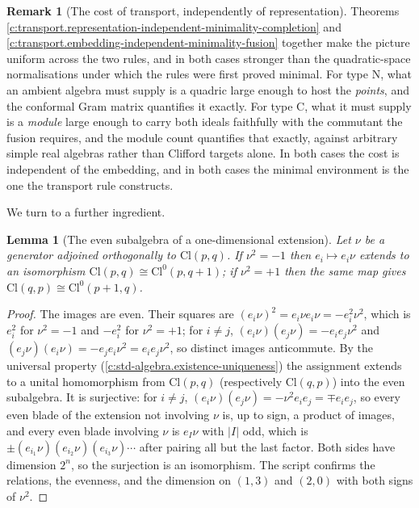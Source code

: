 \documentclass[11pt]{article}
\newtheorem{lemma}[theorem]{Lemma}
\theoremstyle{definition}
\newtheorem{remark}[theorem]{Remark}
\theoremstyle{plain}
\providecommand{\Cl}{}\renewcommand{\Cl}{\mathrm{Cl}}
\begin{document}
\begin{remark}[The cost of transport, independently of representation]\label{c:note.transport.cost-transport-independently-representation}
Theorems \ref{c:transport.representation-independent-minimality-completion} and \ref{c:transport.embedding-independent-minimality-fusion} together make the picture uniform across the two rules, and in both cases stronger than the quadratic-space normalisations under which the rules were first proved minimal. For type N, what an ambient algebra must supply is a quadric large enough to host the \emph{points}, and the conformal Gram matrix quantifies it exactly. For type C, what it must supply is a \emph{module} large enough to carry both ideals faithfully with the commutant the fusion requires, and the module count quantifies that exactly, against arbitrary simple real algebras rather than Clifford targets alone. In both cases the cost is independent of the embedding, and in both cases the minimal environment is the one the transport rule constructs.
\end{remark}

We turn to a further ingredient.

\begin{lemma}[The even subalgebra of a one-dimensional extension]\label{c:transport.even-subalgebra-one-dimensional-extension}
Let $\nu$ be a generator adjoined orthogonally to $\Cl(p,q)$. If $\nu^2 = -1$ then $e_i \mapsto e_i\nu$ extends to an isomorphism $\Cl(p,q) \cong \Cl^0(p,q{+}1)$; if $\nu^2 = +1$ then the same map gives $\Cl(q,p) \cong \Cl^0(p{+}1,q)$.
\end{lemma}
\begin{proof}
The images are even. Their squares are $(e_i\nu)^2 = e_i\nu e_i\nu = -e_i^2\nu^2$, which is $e_i^2$ for $\nu^2 = -1$ and $-e_i^2$ for $\nu^2 = +1$; for $i \neq j$, $(e_i\nu)(e_j\nu) = -e_ie_j\nu^2$ and $(e_j\nu)(e_i\nu) = -e_je_i\nu^2 = e_ie_j\nu^2$, so distinct images anticommute. By the universal property (\ref{c:std-algebra.existence-uniqueness}) the assignment extends to a unital homomorphism from $\Cl(p,q)$ (respectively $\Cl(q,p)$) into the even subalgebra. It is surjective: for $i \neq j$, $(e_i\nu)(e_j\nu) = -\nu^2 e_ie_j = \mp e_ie_j$, so every even blade of the extension not involving $\nu$ is, up to sign, a product of images, and every even blade involving $\nu$ is $e_I\nu$ with $|I|$ odd, which is $\pm(e_{i_1}\nu)(e_{i_2}\nu)(e_{i_3}\nu)\cdots$ after pairing all but the last factor. Both sides have dimension $2^n$, so the surjection is an isomorphism. The script confirms the relations, the evenness, and the dimension on $(1,3)$ and $(2,0)$ with both signs of $\nu^2$.

\end{proof}
\end{document}
